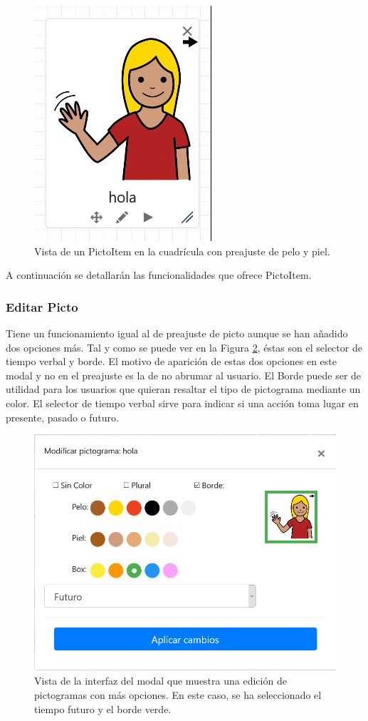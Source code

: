 \begin{figure}[h!]
	\centering
	\includegraphics[width=0.4\linewidth]{Imagenes/Bitmap/pictoItemModificado}
	\caption{Vista de un PictoItem en la cuadrícula con preajuste de pelo y piel. }
	\label{fig:pictoitemmodificado}
\end{figure}


A continuación se detallarán las funcionalidades que ofrece  PictoItem.


\subsubsection{Editar Picto}

Tiene un funcionamiento igual al de preajuste de picto aunque se han añadido dos opciones más. Tal y como se puede ver en la Figura \ref{fig:modaleditarpicto}, éstas son el selector de tiempo verbal y  borde. El motivo de aparición de estas dos opciones en este modal y no en el preajuste es la de no abrumar al usuario. El Borde puede ser de utilidad para los usuarios que quieran resaltar el tipo de pictograma mediante un color. El selector de tiempo verbal sirve para indicar si una acción toma lugar en presente, pasado o futuro.

\begin{figure}[h!]
	\centering
	\includegraphics[width=0.7\linewidth]{Imagenes/Bitmap/modalEditarPicto}
	\caption{Vista de la interfaz del modal que muestra una edición de pictogramas con más opciones. En este caso, se ha seleccionado el tiempo futuro y el borde verde. }
	\label{fig:modaleditarpicto}
\end{figure}


